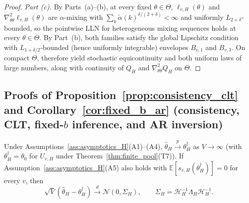 \begin{proof}
\emph{Part (c).} By Parts~(a)--(b), at every fixed $\theta \in \Theta$, $\ell_{v,H}(\theta)$ and $\nabla_{\theta\theta}^2 \ell_{v,H}(\theta)$ are $\alpha$-mixing with $\sum_k \tilde\alpha(k)^{\delta/(2+\delta)} < \infty$ and uniformly $L_{2+\delta}$-bounded, so the pointwise LLN for heterogeneous mixing sequences \citep[Theorem~20.21]{Davidson94} holds at every $\theta \in \Theta$. By Part~(b), both families satisfy the global Lipschitz condition with $L_{1+\delta/2}$-bounded (hence uniformly integrable) envelopes $B_{v,1}$ and $B_{v,3}$. On compact $\Theta$, \citet[Theorem~1 and Lemma~1]{Andrews92} therefore yield stochastic equicontinuity and both uniform laws of large numbers, along with continuity of $Q_H$ and $\nabla_{\theta\theta}^2 Q_H$ on $\Theta$.
\end{proof}

\subsection{Proofs of Proposition~\ref{prop:consistency_clt} and Corollary~\ref{cor:fixed_b_ar} (consistency, CLT, fixed-$b$ inference, and AR inversion)}
\label{sec:proofs_prop3_cor1}

\begin{proposition}
\label{prop:proof_cons_clt}
Under Assumptions~\ref{ass:asymptotics_H}(A1)--(A4), $\hat\theta_H \xrightarrow{p} \theta_H^\dagger$ as $V \to \infty$ (with $\theta_H^\dagger = \theta_0$ for $U_{v,H}$ under Theorem~\ref{thm:finite_pool}(T7)). If Assumption~\ref{ass:asymptotics_H}(A5) also holds with $\mathbb{E}[s_{v,H}(\theta_H^\dagger)] = 0$ for every $v$, then
\[
\sqrt{V}(\hat\theta_H - \theta_H^\dagger) \xrightarrow{d} \mathcal{N}(0,\Sigma_H),
\qquad
\Sigma_H = \mathcal{H}_H^{-1}\Lambda_H \mathcal{H}_H^{-1}.
\]
\end{proposition}

